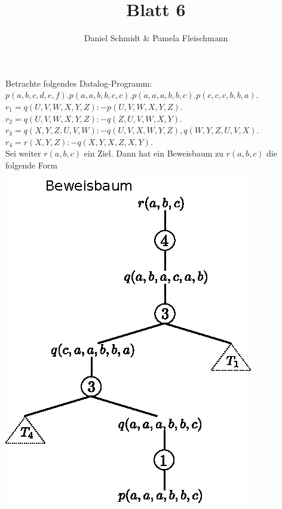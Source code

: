 \documentclass[12pt,a4paper]{amsart}
\begin{document}
\title{Blatt 6}

\author{Daniel Schmidt \& Pamela Fleischmann}

\maketitle

\begin{aufgabe1}

\end{aufgabe1}

\begin{aufgabe1}
Betrachte folgendes Datalog-Programm:\\
$p(a,b,c,d,e,f). p(a,a,b,b,c,c). p(a,a,a,b,b,c). p(c,c,c,b,b,a).$\\
$r_1= q(U,V,W,X,Y,Z) :- p(U,V,W,X,Y,Z).$\\
$r_2=q(U,V,W,X,Y,Z) :- q(Z,U,V,W,X,Y).$\\
$r_3=q(X,Y,Z,U,V,W) :- q(U,V,X,W,Y,Z), q(W,Y,Z,U,V,X).$\\
$r_4=r(X,Y,Z) :- q(X,Y,X,Z,X,Y).$\\
Sei weiter $r(a,b,c)$ ein Ziel. Dann hat ein Beweisbaum zu $r(a,b,c)$ die folgende Form
\begin{center}
\includegraphics[]{tree.eps}

\end{center}
\end{aufgabe1}
\end{document}
